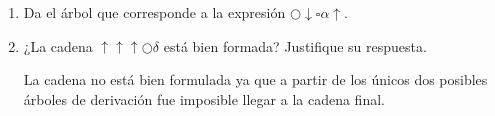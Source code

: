 \documentclass[10pt,letterpaper]{article}
\begin{document}
\begin{enumerate}
\begin{enumerate}
            \item Da el árbol que corresponde a la expresión $\bigcirc \downarrow \square \alpha \uparrow$.
                \begin{center}
                \end{center}

            \clearpage
            \item ¿La cadena $\uparrow \uparrow \uparrow \bigcirc \delta$ está bien formada?
                  Justifique su respuesta.
                \begin{multicols}{2}
                    \begin{center}
                    \end{center}
                    \begin{center}
                    \end{center}
                \end{multicols}
                La cadena no está bien formulada ya que a partir de los únicos dos posibles
                árboles de derivación fue imposible llegar a la cadena final.
        \end{enumerate}


\end{enumerate}
\end{document}
